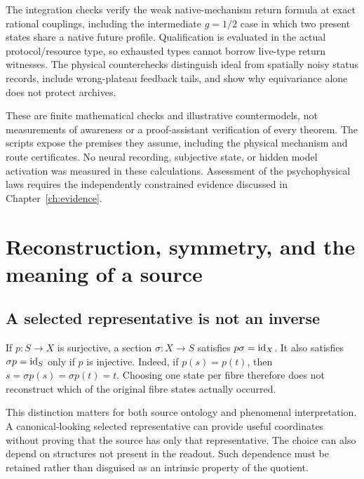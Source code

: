 The integration checks verify the weak native-mechanism return formula at exact rational couplings, including the intermediate $g=1/2$ case in which two present states share a native future profile. Qualification is evaluated in the actual protocol/resource type, so exhausted types cannot borrow live-type return witnesses. The physical counterchecks distinguish ideal from spatially noisy status records, include wrong-plateau feedback tails, and show why equivariance alone does not protect archives.

These are finite mathematical checks and illustrative countermodels, not measurements of awareness or a proof-assistant verification of every theorem. The scripts expose the premises they assume, including the physical mechanism and route certificates. No neural recording, subjective state, or hidden model activation was measured in these calculations. Assessment of the psychophysical laws requires the independently constrained evidence discussed in Chapter~\ref{ch:evidence}.

\chapter{Reconstruction, symmetry, and the meaning of a source}\label{app:reconstruction}
\section{A selected representative is not an inverse}\label{section:reconstruction:a-selected-representative-is-not-an-inverse}
If $p:S\to X$ is surjective, a section $\sigma:X\to S$ satisfies $p\sigma=\mathrm{id}_X$. It also satisfies $\sigma p=\mathrm{id}_S$ only if $p$ is injective. Indeed, if $p(s)=p(t)$, then $s=\sigma p(s)=\sigma p(t)=t$. Choosing one state per fibre therefore does not reconstruct which of the original fibre states actually occurred.

This distinction matters for both source ontology and phenomenal interpretation. A canonical-looking selected representative can provide useful coordinates without proving that the source has only that representative. The choice can also depend on structures not present in the readout. Such dependence must be retained rather than disguised as an intrinsic property of the quotient.

